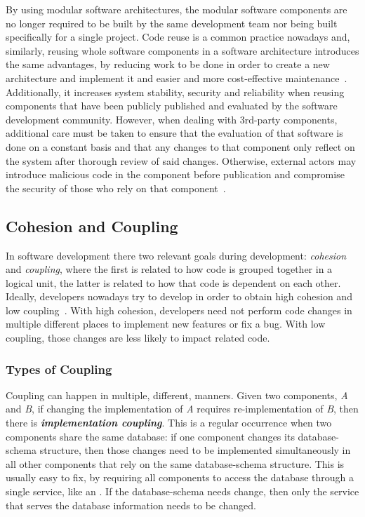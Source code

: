 By using modular software architectures, the modular software components are no longer required to be built by the same development team nor being built specifically for a single project. 
Code reuse is a common practice nowadays and, similarly, reusing whole software components in a software architecture introduces the same advantages, by reducing work to be done in order to create a new architecture and implement it and easier and more cost-effective maintenance~\Parencite{hasselbring2018software}. Additionally, it increases system stability, security and reliability when reusing components that have been publicly published and evaluated by the software development community. However, when dealing with 3rd-party components, additional care must be taken to ensure that the evaluation of that software is done on a constant basis and that any changes to that component only reflect on the system after thorough review of said changes. Otherwise, external actors may introduce malicious code in the component before publication and compromise the security of those who rely on that component~\Parencite{tal_2022}.

\subsection{Cohesion and Coupling}\label{state-of-the-art:ss:cohesion-and-coupling}
In software development there two relevant goals during development: \textit{cohesion} and \textit{coupling}, where the first is related to how code is grouped together in a logical unit, the latter is related to how that code is dependent on each other. Ideally, developers nowadays try to develop in order to obtain high cohesion and low coupling~\Parencite{candela_bavota_russo_oliveto_2016}. With high cohesion, developers need not perform code changes in multiple different places to implement new features or fix a bug. With low coupling, those changes are less likely to impact related code.

\subsubsection{Types of Coupling}\label{state-of-the-art:ss:types-of-coupling}


Coupling can happen in multiple, different, manners. Given two components, \textit{A} and \textit{B}, if changing the implementation of \textit{A} requires re-implementation of \textit{B}, then there is \textbf{\textit{implementation coupling}}. This is a regular occurrence when two components share the same database: if one component changes its database-schema structure, then those changes need to be implemented simultaneously in all other components that rely on the same database-schema structure. This is usually easy to fix, by requiring all components to access the database through a single service, like an . If the database-schema needs change, then only the service that serves the database information needs to be changed.

